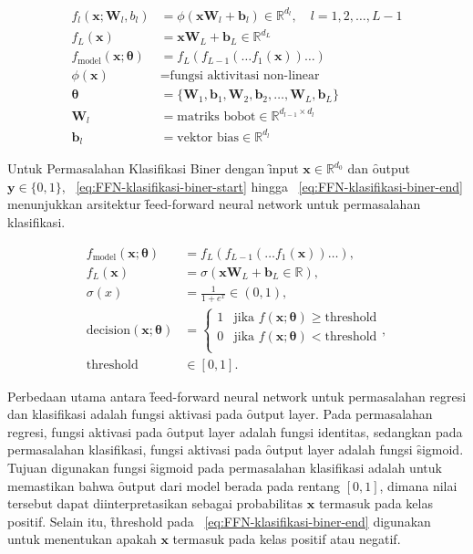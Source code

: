    \begin{align}
        \label{eq:FFN-regesi-start}
        f_l(\mathbf{x};\mathbf{W}_l, b_l) &= \phi( \mathbf{x} \mathbf{W}_l + \mathbf{b}_l) \in \mathbb{R}^{d_l}, \quad l = 1, 2, \dots, L-1 \\
        f_L(\mathbf{x}) &= \mathbf{x} \mathbf{W}_L + \mathbf{b}_L \in \mathbb{R}^{d_L} \\
        f_{\text{model}}(\mathbf{x};\bm{\theta}) &= f_L(f_{L-1}(\dots f_1(\mathbf{x})) \dots) \\
        \phi(\mathbf{x}) &= \text{fungsi aktivitasi non-linear} \\
        \bm{\theta} &= \{\mathbf{W}_1, \mathbf{b}_1, \mathbf{W}_2, \mathbf{b}_2, \dots, \mathbf{W}_L, \mathbf{b}_L\} \\
        \mathbf{W}_l &= \text{matriks bobot}  \in \mathbb{R}^{d_{l-1} \times d_l} \\
        \label{eq:FFN-regesi-end}
        \mathbf{b}_l &= \text{vektor bias} \in \mathbb{R}^{d_l}
    \end{align} 

    Untuk Permasalahan Klasifikasi Biner dengan \f{input} $\mathbf{x}\in \mathbb{R}^{d_0}$ dan \f{output} $\mathbf{y} \in \{0, 1\}$, \equ~\ref{eq:FFN-klasifikasi-biner-start} hingga \equ~\ref{eq:FFN-klasifikasi-biner-end} menunjukkan arsitektur \f{feed-forward neural network} untuk permasalahan klasifikasi.

    \begin{align}
        \label{eq:FFN-klasifikasi-biner-start}
        f_{\text{model}}(\mathbf{x};\bm{\theta}) &= f_L(f_{L-1}(\dots f_1(\mathbf{x})) \dots), \\
        f_L(\mathbf{x}) &= \sigma(\mathbf{x} \mathbf{W}_L + \mathbf{b}_L \in \mathbb{R}), \\
        \sigma(x) &= \frac{1}{1 + e^{x}} \in (0, 1), \\
        \text{decision}(\mathbf{x};\bm{\theta}) &= \begin{cases}
        1 & \text{jika } f(\mathbf{x};\bm{\theta}) \geq \text{threshold} \\
        0 & \text{jika } f(\mathbf{x};\bm{\theta}) < \text{threshold} \\
        \end{cases}, \\
        \label{eq:FFN-klasifikasi-biner-end}
        \text{threshold}&\in [0, 1].
    \end{align}

    Perbedaan utama antara \f{feed-forward neural network} untuk permasalahan regresi dan klasifikasi adalah fungsi aktivasi pada \f{output layer}. Pada permasalahan regresi, fungsi aktivasi pada \f{output layer} adalah fungsi identitas, sedangkan pada permasalahan klasifikasi, fungsi aktivasi pada \f{output layer} adalah fungsi \f{sigmoid}. Tujuan digunakan fungsi \f{sigmoid} pada permasalahan klasifikasi adalah untuk memastikan bahwa \f{output} dari model berada pada rentang $[0, 1]$, dimana nilai tersebut dapat diinterpretasikan sebagai probabilitas $\mathbf{x}$ termasuk pada kelas positif. Selain itu, \f{threshold} pada \equ~\ref{eq:FFN-klasifikasi-biner-end} digunakan untuk menentukan apakah $\mathbf{x}$ termasuk pada kelas positif atau negatif.

